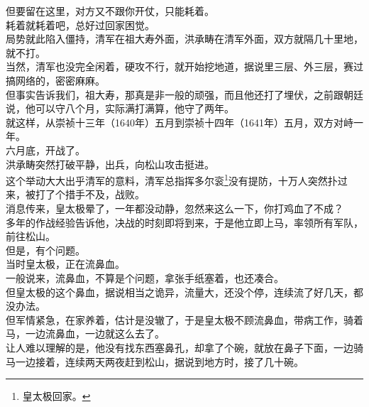 \begin{multicols}{\theparacolNo}
但要留在这里，对方又不跟你开仗，只能耗着。\\

耗着就耗着吧，总好过回家困觉。\\

局势就此陷入僵持，清军在祖大寿外面，洪承畴在清军外面，双方就隔几十里地，就不打。\\

当然，清军也没完全闲着，硬攻不行，就开始挖地道，据说里三层、外三层，赛过搞网络的，密密麻麻。\\

但事实告诉我们，祖大寿，那真是非一般的顽强，而且他还打了埋伏，之前跟朝廷说，他可以守八个月，实际满打满算，他守了两年。\\

就这样，从崇祯十三年（1640年）五月到崇祯十四年（1641年）五月，双方对峙一年。\\

六月底，开战了。\\

洪承畴突然打破平静，出兵，向松山攻击挺进。\\

这个举动大大出乎清军的意料，清军总指挥多尔衮\footnote{皇太极回家。}没有提防，十万人突然扑过来，被打了个措手不及，战败。\\

消息传来，皇太极晕了，一年都没动静，忽然来这么一下，你打鸡血了不成？\\

多年的作战经验告诉他，决战的时刻即将到来，于是他立即上马，率领所有军队，前往松山。\\

但是，有个问题。\\

当时皇太极，正在流鼻血。\\

一般说来，流鼻血，不算是个问题，拿张手纸塞着，也还凑合。\\

但皇太极的这个鼻血，据说相当之诡异，流量大，还没个停，连续流了好几天，都没办法。\\

但军情紧急，在家养着，估计是没辙了，于是皇太极不顾流鼻血，带病工作，骑着马，一边流鼻血，一边就这么去了。\\

让人难以理解的是，他没有找东西塞鼻孔，却拿了个碗，就放在鼻子下面，一边骑马一边接着，连续两天两夜赶到松山，据说到地方时，接了几十碗。\\


\end{multicols}
